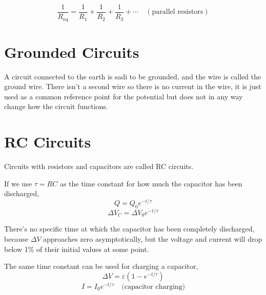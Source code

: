 \documentclass{article}
\begin{document}
\[\frac{1}{R_\text{eq}}=\frac{1}{R_1} + \frac{1}{R_2} + \frac{1}{R_3} + \cdots\quad
(\text{parallel resistors})\]

\section*{Grounded Circuits}
A circuit connected to the earth is sadi to be grounded, and the wire is called the ground wire.
There isn't a second wire so there is no current in the wire, it is just used as a common reference
point for the potential but does not in any way change how the circuit functions.

\section*{RC Circuits}
Circuits with resistors and capacitors are called RC circuits.

If we use $\tau=RC$ as the time constant for how much the capacitor has been discharged,
\[Q=Q_0 e^{-t/\tau}\]
\[\Delta V_C=\Delta V_0 e^{-t/\tau}\]

There's no specific time at which the capacitor has been completely discharged, because $\Delta V$
approaches zero asymptotically, but the voltage and current will drop below 1\% of their initial
values at some point.

\vspace{1em}

The same time constant can be used for charging a capacitor,
\[\Delta V=\varepsilon(1-e^{-t/\tau})\]
\[I=I_0 e^{-t/\tau}\quad\text{(capacitor charging)}\]
\end{document}
